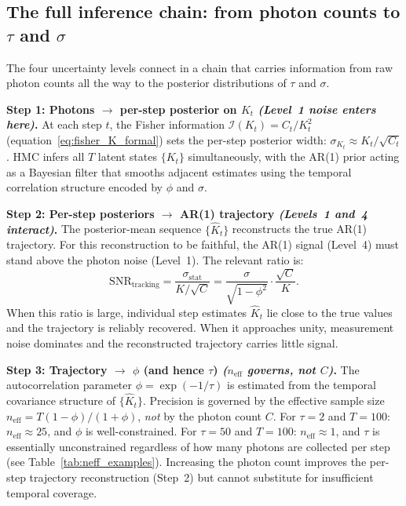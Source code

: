 \documentclass[11pt, a4paper]{article}
\begin{document}
\subsection*{The full inference chain: from photon counts to $\tau$ and $\sigma$}

The four uncertainty levels connect in a chain that carries information from raw
photon counts all the way to the posterior distributions of $\tau$ and $\sigma$.

\medskip
\noindent\textbf{Step 1: Photons $\to$ per-step posterior on $K_t$
\emph{(Level~1 noise enters here)}.}
At each step $t$, the Fisher information $\mathcal{I}(K_t) = C_t/K_t^2$
(equation~\eqref{eq:fisher_K_formal}) sets the per-step posterior width:
$\sigma_{K_t} \approx K_t/\sqrt{C_t}$.
HMC infers all $T$ latent states $\{K_t\}$ simultaneously, with the AR(1) prior
acting as a Bayesian filter that smooths adjacent estimates using the temporal
correlation structure encoded by $\phi$ and $\sigma$.

\medskip
\noindent\textbf{Step 2: Per-step posteriors $\to$ AR(1) trajectory
\emph{(Levels~1 and~4 interact)}.}
The posterior-mean sequence $\{\hat K_t\}$ reconstructs the true AR(1) trajectory.
For this reconstruction to be faithful, the AR(1) signal (Level~4) must stand above
the photon noise (Level~1).
The relevant ratio is:
\begin{equation}
    \mathrm{SNR}_\mathrm{tracking}
    = \frac{\sigma_\mathrm{stat}}{K/\sqrt{C}}
    = \frac{\sigma}{\sqrt{1-\phi^2}}\cdot\frac{\sqrt{C}}{K}.
\end{equation}
When this ratio is large, individual step estimates $\hat K_t$ lie close to the true
values and the trajectory is reliably recovered.
When it approaches unity, measurement noise dominates and the reconstructed trajectory
carries little signal.

\medskip
\noindent\textbf{Step 3: Trajectory $\to$ $\phi$ (and hence $\tau$)
\emph{($n_\mathrm{eff}$ governs, not $C$)}.}
The autocorrelation parameter $\phi = \exp(-1/\tau)$ is estimated from the temporal
covariance structure of $\{\hat K_t\}$.
Precision is governed by the effective sample size
$n_\mathrm{eff} = T(1-\phi)/(1+\phi)$, \emph{not} by the photon count $C$.
For $\tau = 2$ and $T = 100$: $n_\mathrm{eff} \approx 25$, and $\phi$ is well-constrained.
For $\tau = 50$ and $T = 100$: $n_\mathrm{eff} \approx 1$, and $\tau$ is essentially
unconstrained regardless of how many photons are collected per step
(see Table~\ref{tab:neff_examples}).
Increasing the photon count improves the per-step trajectory reconstruction (Step~2)
but cannot substitute for insufficient temporal coverage.
\end{document}
